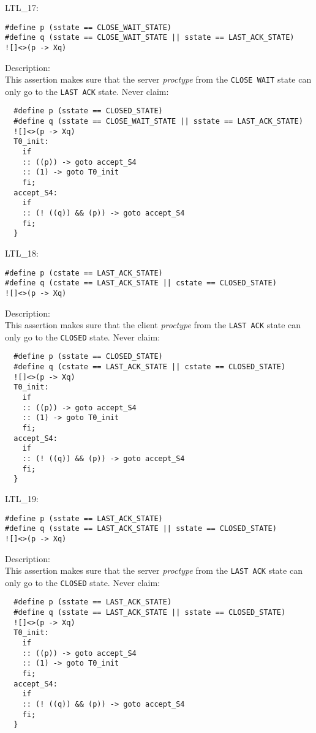 \documentclass{WigReport}
\begin{document}
LTL\_17:\\
\begin{verbatim}
#define p (sstate == CLOSE_WAIT_STATE)
#define q (sstate == CLOSE_WAIT_STATE || sstate == LAST_ACK_STATE)
![]<>(p -> Xq)
\end{verbatim}
Description:\\
This assertion makes sure that the server \textit{proctype} from the \verb|CLOSE WAIT| state can only go to the \verb|LAST ACK| state.
Never claim:\\
\begin{verbatim}
  #define p (sstate == CLOSED_STATE)
  #define q (sstate == CLOSE_WAIT_STATE || sstate == LAST_ACK_STATE)
  ![]<>(p -> Xq)
  T0_init:
    if
    :: ((p)) -> goto accept_S4
    :: (1) -> goto T0_init
    fi;
  accept_S4:
    if
    :: (! ((q)) && (p)) -> goto accept_S4
    fi;
  }
\end{verbatim}


LTL\_18:\\
\begin{verbatim}
#define p (cstate == LAST_ACK_STATE)
#define q (cstate == LAST_ACK_STATE || cstate == CLOSED_STATE)
![]<>(p -> Xq)
\end{verbatim}
Description:\\
This assertion makes sure that the client \textit{proctype} from the \verb|LAST ACK| state can only go to the \verb|CLOSED| state.
Never claim:\\
\begin{verbatim}
  #define p (sstate == CLOSED_STATE)
  #define q (cstate == LAST_ACK_STATE || cstate == CLOSED_STATE)
  ![]<>(p -> Xq)
  T0_init:
    if
    :: ((p)) -> goto accept_S4
    :: (1) -> goto T0_init
    fi;
  accept_S4:
    if
    :: (! ((q)) && (p)) -> goto accept_S4
    fi;
  }
\end{verbatim}


LTL\_19:\\
\begin{verbatim}
#define p (sstate == LAST_ACK_STATE)
#define q (sstate == LAST_ACK_STATE || sstate == CLOSED_STATE)
![]<>(p -> Xq)
\end{verbatim}
Description:\\
This assertion makes sure that the server \textit{proctype} from the \verb|LAST ACK| state can only go to the \verb|CLOSED| state.
Never claim:\\
\begin{verbatim}
  #define p (sstate == LAST_ACK_STATE)
  #define q (sstate == LAST_ACK_STATE || sstate == CLOSED_STATE)
  ![]<>(p -> Xq)
  T0_init:
    if
    :: ((p)) -> goto accept_S4
    :: (1) -> goto T0_init
    fi;
  accept_S4:
    if
    :: (! ((q)) && (p)) -> goto accept_S4
    fi;
  }
\end{verbatim}
\end{document}
